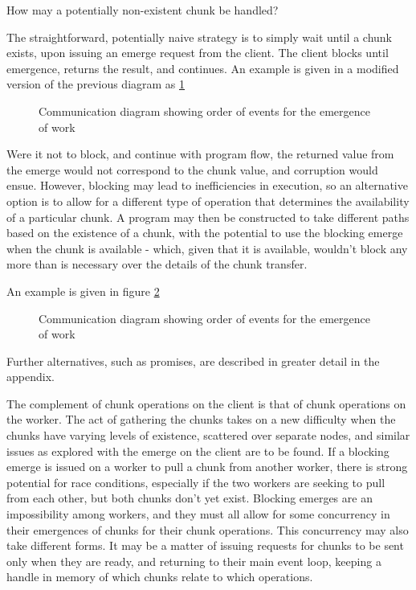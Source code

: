 How may a potentially non-existent chunk be handled?

The straightforward, potentially naive strategy is to simply wait until
a chunk exists, upon issuing an emerge request from the client. The
client blocks until emergence, returns the result, and continues. An
example is given in a modified version of the previous diagram as \ref{fig:work-emergence}

\begin{figure}
  \centering
  
  \caption{Communication diagram showing order of events for the emergence of work}
  \label{fig:work-emergence}
\end{figure}

Were it not to block, and continue with program flow, the returned value
from the emerge would not correspond to the chunk value, and corruption
would ensue. However, blocking may lead to inefficiencies in execution,
so an alternative option is to allow for a different type of operation
that determines the availability of a particular chunk. A program may
then be constructed to take different paths based on the existence of a
chunk, with the potential to use the blocking emerge when the chunk is
available - which, given that it is available, wouldn't block any more
than is necessary over the details of the chunk transfer.

An example is given in figure \ref{fig:work-request-checking}

\begin{figure}
  \centering
  
  \caption{Communication diagram showing order of events for the emergence
    of work}
  \label{fig:work-request-checking}
\end{figure}

Further alternatives, such as promises, are described in greater detail
in the appendix.

The complement of chunk operations on the client is that of chunk
operations on the worker. The act of gathering the chunks takes on a new
difficulty when the chunks have varying levels of existence, scattered
over separate nodes, and similar issues as explored with the emerge on
the client are to be found. If a blocking emerge is issued on a worker
to pull a chunk from another worker, there is strong potential for race
conditions, especially if the two workers are seeking to pull from each
other, but both chunks don't yet exist. Blocking emerges are an
impossibility among workers, and they must all allow for some
concurrency in their emergences of chunks for their chunk operations.
This concurrency may also take different forms. It may be a matter of
issuing requests for chunks to be sent only when they are ready, and
returning to their main event loop, keeping a handle in memory of which
chunks relate to which operations.

